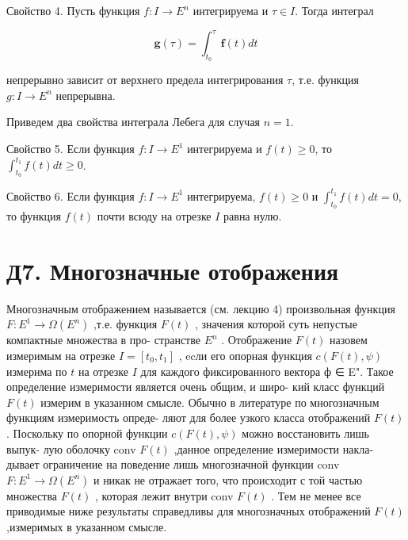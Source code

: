 \documentclass[8pt]{extarticle}
\begin{document}
Свойство 4. Пусть функция \(f : I \rightarrow  {E}^{n}\) интегрируема и \(\tau  \in  I\). Тогда интеграл

\[
\mathbf{g}\left( \tau \right)  = {\int }_{{t}_{0}}^{\tau }\mathbf{f}\left( t\right) {dt}
\]

непрерывно зависит от верхнего предела интегрирования \(\tau\), т.е. функция \(g : I \rightarrow  {E}^{n}\) непрерывна.

Приведем два свойства интеграла Лебега для случая \(n = 1\).

Свойство 5. Если функция \(f : I \rightarrow  {E}^{1}\) интегрируема и \(f\left( t\right)  \geq  0\), то \({\int }_{{t}_{0}}^{{t}_{1}}f\left( t\right) {dt} \geq  0\).

Свойство 6. Если функция \(f : I \rightarrow  {E}^{1}\) интегрируема, \(f\left( t\right)  \geq  0\) и \({\int }_{{t}_{0}}^{{t}_{1}}f\left( t\right) {dt} = 0\), то функция \(f\left( t\right)\) почти всюду на отрезке \(I\) равна нулю.

\section*{Д7. Многозначные отображения}
\iffalse

Многозначным отображением называется (см. лекцию 4) произвольная функция \(F : {E}^{1} \rightarrow  \Omega \left( {E}^{n}\right)\) ,т.е. функция \(F\left( t\right)\) , значения которой суть непустые компактные множества в про- странстве \({E}^{n}\) . Отображение \(F\left( t\right)\) назовем измеримым на отрезке \(I = \left\lbrack  {{t}_{0},{t}_{1}}\right\rbrack\) , ecли его опорная функция \(c\left( {F\left( t\right) ,\psi }\right)\) измерима по \(t\) на отрезке \(I\) для каждого фиксированного вектора ф ∈ E". Такое определение измеримости является очень общим, и широ- кий класс функций \(F\left( t\right)\) измерим в указанном смысле. Обычно в литературе по многозначным функциям измеримость опреде- ляют для более узкого класса отображений \(F\left( t\right)\) . Поскольку по опорной функции \(c\left( {F\left( t\right) ,\psi }\right)\) можно восстановить лишь выпук- лую оболочку conv \(F\left( t\right)\) ,данное определение измеримости накла- дывает ограничение на поведение лишь многозначной функции conv \(F : {E}^{1} \rightarrow  \Omega \left( {E}^{n}\right)\) и никак не отражает того, что происходит с той частью множества \(F\left( t\right)\) , которая лежит внутри conv \(F\left( t\right)\) . Тем не менее все приводимые ниже результаты справедливы для многозначных отображений \(F\left( t\right)\) ,измеримых в указанном смысле.
\end{document}
